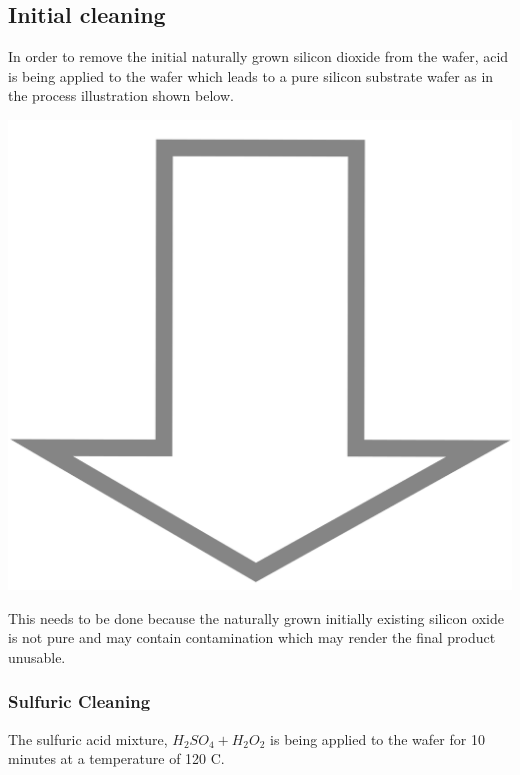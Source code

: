 \subsection{Initial cleaning}
In order to remove the initial naturally grown silicon dioxide from the wafer, acid is being applied to the wafer which leads to a pure silicon substrate wafer as in the process illustration shown below.

\begin{center}
	\begin{tikzpicture}[node distance = 3cm, auto, thick,scale=0.3, every node/.style={transform shape}]
		
	\end{tikzpicture}

	\includegraphics[scale=0.01]{down_arrow.png}

	\begin{tikzpicture}[node distance = 3cm, auto, thick,scale=0.3, every node/.style={transform shape}]
		
	\end{tikzpicture}
\end{center}

This needs to be done because the naturally grown initially existing silicon oxide is not pure and may contain contamination which may render the final product unusable.

\subsubsection{Sulfuric Cleaning}
The sulfuric acid mixture, $H_2 S O_4 + H_2 O_2$ is being applied to the wafer for 10 minutes at a temperature of 120 \degree C.

